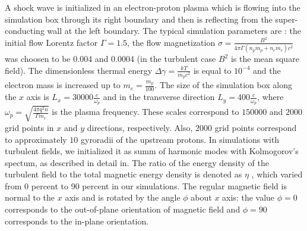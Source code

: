 \documentclass[a4paper]{jpconf}
\begin{document}
	A shock wave is initialized in an electron-proton plasma which is flowing into the simulation box through its right boundary and then is reflecting from the super-conducting wall at the left boundary.  The typical simulation parameters are : the initial flow Lorentz factor $\Gamma = 1.5$, the flow magnetization $\sigma = \frac{B^2}{4\pi\Gamma (n_p m_p + n_e m_e) c^2}$ was choosen to be  0.004 and 0.0004  (in the turbulent case $B^2$ is the mean square field). The dimensionless thermal energy $\Delta \gamma = \frac{k T}{m_p c^2}$ is equal to $10^{-4}$ and the electron mass is increased up to $m_e = \frac{m_p}{100}$. The size of the simulation box along the $x$ axis is $L_x = 30000\frac{c}{\omega_p}$ and in the transverse direction $L_y = 400\frac{c}{\omega_p}$, where $\omega_p = \sqrt{\frac{4\pi q^2 n}{\Gamma m_e}}$ is the plasma frequency. These scales correspond to $150000$ and $2000$ grid points in $x$ and $y$ directions, respectively. Also, $2000$ grid points correspond to approximately $10$ gyroradii of the upstream protons.
	In simulations with turbulent fields, we initialized it as  summ of harmonic modes with Kolmogorov's spectum, as described in detail in\cite{Romansky2019}. The ratio of the energy density of the turbulent field to the total magnetic energy density is denoted as $\eta$ , which varied from 0 percent to 90 percent in our simulations. The regular magnetic field is normal to the $x$ axis and is rotated by the angle $\phi$ about $x$ axis: the value $\phi = 0$ corresponds to the out-of-plane orientation of magnetic field and $\phi = 90$ corresponds to the in-plane orientation.
	
	
	
\end{document}
